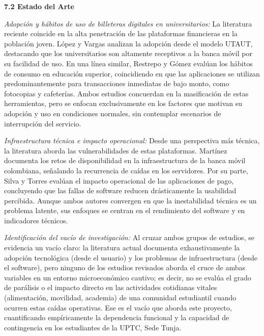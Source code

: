 \vspace{0.4cm}
\noindent\textbf{\large 7.2 Estado del Arte}\par\vspace{0.2cm}
\textit{Adopción y hábitos de uso de billeteras digitales en universitarios:} La literatura reciente coincide en la alta penetración de las plataformas financieras en la población joven. López y Vargas \cite{lopez2023adopcion} analizan la adopción desde el modelo UTAUT, destacando que los universitarios son altamente receptivos a la banca móvil por su facilidad de uso. En una línea similar, Restrepo y Gómez \cite{restrepo2023habitos} evalúan los hábitos de consumo en educación superior, coincidiendo en que las aplicaciones se utilizan predominantemente para transacciones inmediatas de bajo monto, como fotocopias y cafeterías. Ambos estudios concuerdan en la masificación de estas herramientas, pero se enfocan exclusivamente en los factores que motivan su adopción y uso en condiciones normales, sin contemplar escenarios de interrupción del servicio.

\textit{Infraestructura técnica e impacto operacional:} Desde una perspectiva más técnica, la literatura aborda las vulnerabilidades de estas plataformas. Martínez \cite{martinez2023retos} documenta los retos de disponibilidad en la infraestructura de la banca móvil colombiana, señalando la recurrencia de caídas en los servidores. Por su parte, Silva y Torres \cite{silva2022evaluacion} evalúan el impacto operacional de las aplicaciones de pago, concluyendo que las fallas de software reducen drásticamente la usabilidad percibida. Aunque ambos autores convergen en que la inestabilidad técnica es un problema latente, sus enfoques se centran en el rendimiento del software y en indicadores técnicos.

\textit{Identificación del vacío de investigación:} Al cruzar ambos grupos de estudios, se evidencia un vacío claro: la literatura actual documenta exhaustivamente la adopción tecnológica (desde el usuario) y los problemas de infraestructura (desde el software), pero ninguno de los estudios revisados aborda el cruce de ambas variables en un entorno microeconómico cautivo; es decir, no se evalúa el grado de parálisis o el impacto directo en las actividades cotidianas vitales (alimentación, movilidad, academia) de una comunidad estudiantil cuando ocurren estas caídas operativas. Ese es el vacío que aborda este proyecto, cuantificando empíricamente la dependencia funcional y la capacidad de contingencia en los estudiantes de la UPTC, Sede Tunja.

